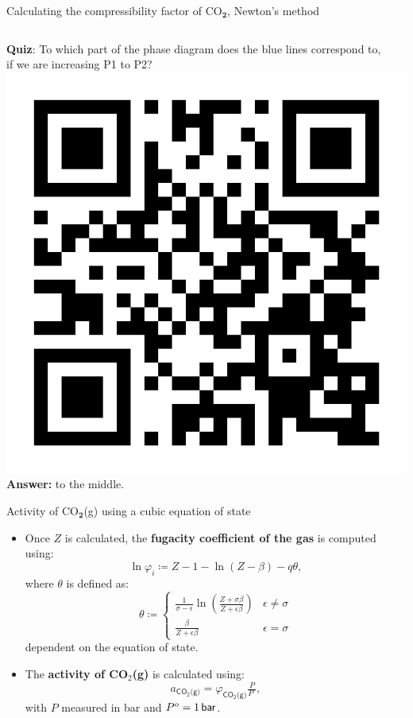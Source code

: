 \begin{frame}{Calculating the compressibility factor of CO$_{\boldsymbol{2}}$, Newton's method}
\begin{columns}[t]
\end{columns}

\pause
\alert{\textbf{Quiz}}: To which part of the phase diagram does the blue lines correspond to, \\ 
if we are increasing P1 to P2?
\vskip -30pt
\includegraphics[height=0.12\columnwidth, right]{figures/activity-models/poll-ionic-strength.png}
\hiddenpause
\vskip -20pt
\textbf{Answer:} to the middle. 
\end{frame}
%
%
\begin{frame}{Activity of CO$_{\boldsymbol{2}}$(g) using a cubic equation of state}
\begin{itemize}
\item Once $Z$ is calculated, the \alert{\textbf{fugacity coefficient of the gas}} is computed
using:
\[
\boxed{\ln\varphi_{i}\coloneqq Z-1-\ln(Z-\beta)-q\theta},
\]
where $\theta$ is defined as:\[
\theta\coloneqq\begin{cases}
{\displaystyle \tfrac{1}{\sigma-\epsilon}\ln\left(\tfrac{Z+\sigma\beta}{Z+\epsilon\beta}\right)} & \epsilon\neq\sigma\\
{\displaystyle \tfrac{\beta}{Z+\epsilon\beta}} & \epsilon=\sigma
\end{cases}
\]
dependent on the equation of state.
\item The \alert{\textbf{activity of CO$_{2}$(g)}} is calculated using:
\[
a_{\mathsf{CO_{2}\text{(g)}}}=\varphi_{\mathsf{CO_{2}\text{(g)}}}\tfrac{P}{P^{\circ}},
\]
with $P$ measured in bar and $P^{\circ}=\unit[1]{\mathsf{bar}}$.
\end{itemize}
\end{frame}
%
%
